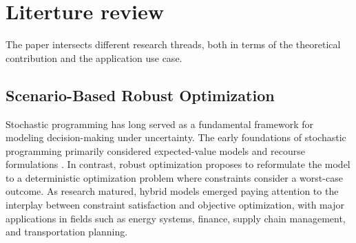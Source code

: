 \documentclass[opre,sglanonrev,11pt]{informs4}
\begin{document}



\section{Literture review} \label{Sec:literature}

The paper intersects different research threads, both in terms of the theoretical contribution and the application use case.

\subsection{Scenario-Based Robust Optimization}

Stochastic programming has long served as a fundamental framework for modeling decision-making under uncertainty. The early foundations of stochastic programming primarily considered expected-value models and recourse formulations \cite{B55,D55}. In contrast, robust optimization \cite{BN98,BS04} proposes to reformulate the model to a deterministic optimization problem where constraints consider a worst-case outcome. As research matured, hybrid models emerged paying attention to the interplay between constraint satisfaction and objective optimization, with major applications in fields such as energy systems, finance, supply chain management, and transportation planning.
\end{document}
